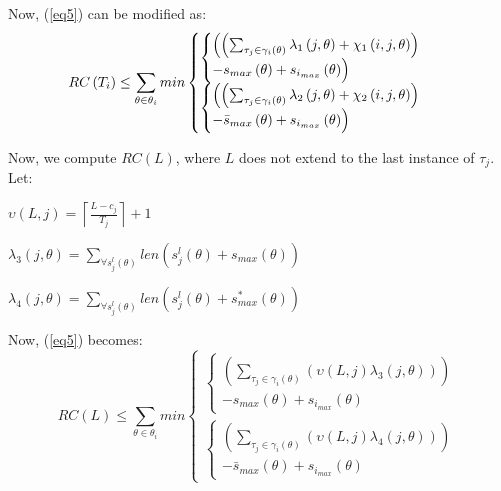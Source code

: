 \documentclass[12pt,english]{report}
\begin{document}
Now, (\ref{eq5}) can be modified as:
\begin{equation}
RC\left(T_{i}\right)\le \sum_{\theta\in\theta_{i}}min\begin{cases}
\begin{cases}
\Bigl(\left(\sum_{\tau_{j}\in\gamma_i\left(\theta\right)}\lambda_{1}\left(j,\theta\right)+\chi_{1}\left(i,j,\theta\right)\right)\\
-s_{max}\left(\theta\right)+s_{i_{max}}\left(\theta\right)\Bigr)\end{cases}\\
\begin{cases}
\Bigl(\left(\sum_{\tau_{j}\in\gamma_i\left(\theta\right)}\lambda_{2}\left(j,\theta\right)+\chi_{2}\left(i,j,\theta\right)\right)\\
-\bar{s}_{max}\left(\theta\right)+s_{i_{max}}\left(\theta\right)\Bigr)\end{cases}\end{cases}\label{eq15}\end{equation}



Now, we compute $RC(L)$, where $L$ does not extend to the last instance of $\tau_{j}$. Let:
\begin{compactitem}
\item $\upsilon\left(L,j\right)=\left\lceil\frac{L-c_{j}}{T_{j}}\right\rceil+1$
\item $\lambda_{3}\left(j,\theta\right)=\sum_{\forall s_{j}^{l}\left(\theta\right)}len\left(s_{j}^{l}\left(\theta\right)+s_{max}\left(\theta\right)\right)$
\item $\lambda_{4}\left(j,\theta\right)=\sum_{\forall s_{j}^{l}\left(\theta\right)}len\left(s_{j}^{l}\left(\theta\right)+s_{max}^{*}\left(\theta\right)\right)$
\end{compactitem}
Now, (\ref{eq5}) becomes: 
\begin{equation}
RC\left(L\right)\le \sum_{\theta\in\theta_{i}}min\begin{cases}
\begin{cases}
\left(\sum_{\tau_{j}\in\gamma_i\left(\theta\right)}\left(\upsilon\left(L,j\right)\lambda_{3}\left(j,\theta\right)\right)\right)\\
-s_{max}\left(\theta\right)+s_{i_{max}}\left(\theta\right)\end{cases}\\
\begin{cases}
\left(\sum_{\tau_{j}\in\gamma_i\left(\theta\right)}\left(\upsilon\left(L,j\right)\lambda_{4}\left(j,\theta\right)\right)\right)\\
-\bar{s}_{max}\left(\theta\right)+s_{i_{max}}\left(\theta\right)\end{cases}\end{cases}\label{eq16}\end{equation}
\end{document}
